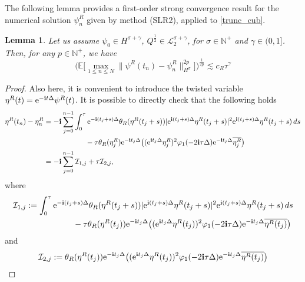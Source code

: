 \documentclass[a4paper]{amsart}
\newtheorem{lemma}[theorem]{Lemma}
\begin{document}
The following lemma provides a first-order strong convergence result for the numerical solution $\psi^R_n$ given by method (SLR2), applied to \eqref{trunc_cub}.
\begin{lemma}
\label{strong_lem_trunc}
    Let us assume $\psi_0\in H^{\sigma+\gamma}$, $Q^{\frac{1}{2}}\in \mathcal{L}_2^{\sigma+\gamma}$, for $\sigma\in\mathbb{N}^+$ and $\gamma\in(0,1]$. Then, for any $p\in\mathbb{N}^+$, we have
    $$
    \big(\mathbb{E}\big[\max_{1\le n\le N}\|\psi^R(t_n)-\psi^R_n\|^{2p}_{H^\sigma}\big]\big)^{\frac{1}{2p}}\lesssim c_R \tau^{\gamma}
    $$
\end{lemma}
\begin{proof}
   Also here, it is convenient to introduce the twisted variable $\eta^R(t)={\rm e}^{-{\bf i}t \Delta}\psi^R(t)$. It is possible to directly check that the following holds
    \begin{align*}
        \eta^R(t_n)-\eta^R_n&=-{\bf i}\sum_{j=0}^{n-1}\int_0^\tau {\rm e}^{-{\bf i}(t_j+s)\Delta}\theta_R(\eta^R(t_j+s))|{\rm e}^{{\bf i}(t_j+s)\Delta}\eta^R(t_j+s)|^2 {\rm e}^{{\bf i}(t_j+s)\Delta}\eta^R(t_j+s)\,ds\\
        &\hspace{2cm}- \tau \theta_R(\eta^R_j){\rm e}^{-{\bf i}t_j\Delta}\big(({\rm e}^{{\bf i}t_j\Delta} \eta^R_j)^2 \varphi_1(-2{\bf i}\tau\Delta){\rm e}^{-{\bf i}t_j\Delta} \overline{\eta_j^R}\big)\\ 
   &=-{\bf i}\sum_{j=0}^{n-1}\mathcal{I}_{1,j}+\tau \mathcal{I}_{2,j},
    \end{align*}
    where 
    \begin{align*}
    \mathcal{I}_{1,j}&:=\int_0^\tau {\rm e}^{-{\bf i}(t_j+s)\Delta}\theta_R(\eta^R(t_j+s))|{\rm e}^{{\bf i}(t_j+s)\Delta}\eta^R(t_j+s)|^2 {\rm e}^{{\bf i}(t_j+s)\Delta}\eta^R(t_j+s)\,ds\\
    &\hspace{2cm}- \tau \theta_R(\eta^R(t_j)){\rm e}^{-{\bf i}t_j\Delta}\big(({\rm e}^{{\bf i}t_j\Delta} \eta^R(t_j))^2 \varphi_1(-2{\bf i}\tau\Delta){\rm e}^{-{\bf i}t_j\Delta} \overline{\eta^R(t_j)}\big)
     \end{align*}
    and
    \begin{align*}
    \mathcal{I}_{2,j}&:=\theta_R(\eta^R(t_j)) {\rm e}^{-{\bf i}t_j\Delta}\big(({\rm e}^{{\bf i}t_j\Delta} \eta^R(t_j))^2 \varphi_1(-2{\bf i}\tau\Delta){\rm e}^{-{\bf i}t_j\Delta} \overline{\eta^R(t_j)}\big)\\

\end{align*}
\end{proof}
\end{document}
